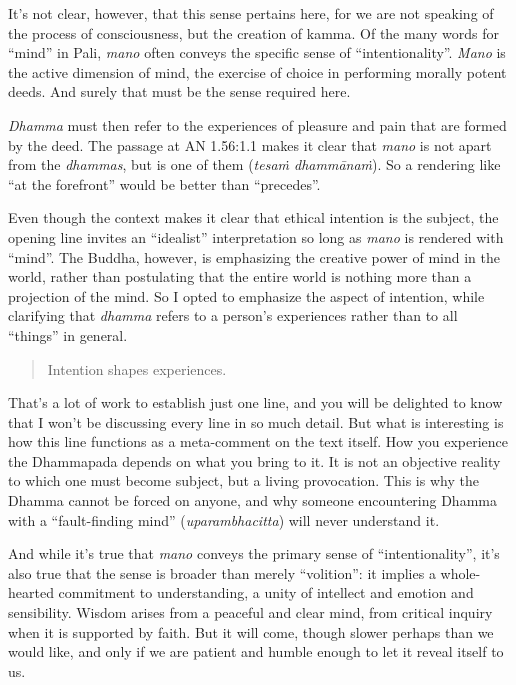 \documentclass[12pt,openany]{book}%
\begin{document}
It’s not clear, however, that this sense pertains here, for we are not speaking of the process of consciousness, but the creation of kamma. Of the many words for “mind” in Pali, \textit{mano} often conveys the specific sense of “intentionality”. \textit{Mano} is the active dimension of mind, the exercise of choice in performing morally potent deeds. And surely that must be the sense required here.

\textit{Dhamma} must then refer to the experiences of pleasure and pain that are formed by the deed. The passage at AN 1.56:1.1 makes it clear that \textit{mano} is not apart from the \textit{dhammas}, but is one of them (\textit{\textsanskrit{tesaṁ} \textsanskrit{dhammānaṁ}}). So a rendering like “at the forefront” would be better than “precedes”.

Even though the context makes it clear that ethical intention is the subject, the opening line invites an “idealist” interpretation so long as \textit{mano} is rendered with “mind”. The Buddha, however, is emphasizing the creative power of mind in the world, rather than postulating that the entire world is nothing more than a projection of the mind. So I opted to emphasize the aspect of intention, while clarifying that \textit{dhamma} refers to a person’s experiences rather than to all “things” in general.

\begin{verse}%
Intention shapes experiences.

%
\end{verse}

That’s a lot of work to establish just one line, and you will be delighted to know that I won’t be discussing every line in so much detail. But what is interesting is how this line functions as a meta-comment on the text itself. How you experience the Dhammapada depends on what you bring to it. It is not an objective reality to which one must become subject, but a living provocation. This is why the Dhamma cannot be forced on anyone, and why someone encountering Dhamma with a “fault-finding mind” (\textit{uparambhacitta}) will never understand it.

And while it’s true that \textit{mano} conveys the primary sense of “intentionality”, it’s also true that the sense is broader than merely “volition”: it implies a whole-hearted commitment to understanding, a unity of intellect and emotion and sensibility. Wisdom arises from a peaceful and clear mind, from critical inquiry when it is supported by faith. But it will come, though slower perhaps than we would like, and only if we are patient and humble enough to let it reveal itself to us.
\end{document}
